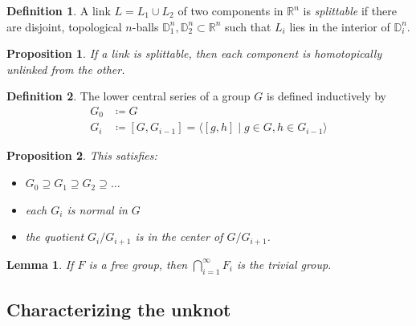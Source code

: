 \documentclass[nobib]{tufte-book} %
\newtheorem{proposition}{Proposition}
\newtheorem{lemma}{Lemma}
\theoremstyle{definition}
\newtheorem{definition}{Definition}
\theoremstyle{remark}
\newcommand{\disk}[1]{\mathbb{D}^{#1}}
\newcommand{\R}{\mathbb{R}}
\begin{document}
\begin{definition}
	A link $L = L_{1} \cup L_{2}$ of two components in $\R^{n}$
	is \textit{splittable} 
	if there are disjoint, topological $n$-balls $\disk{n}_{1}, \disk{n}_{2} \subset \R^{n}$
	such that $L_{i}$ lies in the interior of $\disk{n}_{i}$.
\end{definition}

\begin{proposition}
	\label{prop:splittable_implies_homotopically_unlinked}
	If a link is splittable, then each component is homotopically
	unlinked from the other.
\end{proposition}
	

\begin{definition}
	The lower central series of a group $G$ is defined inductively
	by 
	\begin{align*}
		G_{0} & \coloneqq G \\
		G_{i} & \coloneqq [G, G_{i-1}] = \langle [g, h] \mid g \in G, h \in G_{i-1} \rangle
	\end{align*}
\end{definition}

\begin{proposition}
	This satisfies:
	\begin{itemize}
		\item $G_0 \supseteq G_1 \supseteq G_2 \supseteq \ldots$
		\item each $G_{i}$ is normal in $G$
		\item the quotient $G_{i} / G_{i+1}$ is in the center of $G / G_{i+1}$.
	\end{itemize}
\end{proposition}

\begin{lemma}
	If $F$ is a free group, then $\bigcap_{i=1}^{\infty} F_{i}$ is the
	trivial group.
\end{lemma}

\subsection{Characterizing the unknot}
\end{document}
